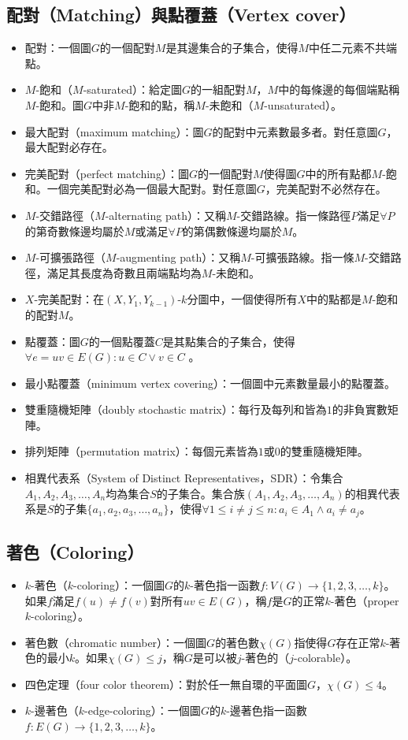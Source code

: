 \documentclass[a4paper,12pt]{report}
\begin{document}
\subsection{配對（Matching）與點覆蓋（Vertex cover）}
\begin{itemize}
\item 配對：一個圖$G$的一個配對$M$是其邊集合的子集合，使得$M$中任二元素不共端點。
\item $M$-飽和（$M$-saturated）：給定圖$G$的一組配對$M$，$M$中的每條邊的每個端點稱$M$-飽和。圖$G$中非$M$-飽和的點，稱$M$-未飽和（$M$-unsaturated）。
\item 最大配對（maximum matching）：圖$G$的配對中元素數最多者。對任意圖$G$，最大配對必存在。
\item 完美配對（perfect matching）：圖$G$的一個配對$M$使得圖$G$中的所有點都$M$-飽和。一個完美配對必為一個最大配對。對任意圖$G$，完美配對不必然存在。
\item $M$-交錯路徑（$M$-alternating path）：又稱$M$-交錯路線。指一條路徑$P$滿足$\forall P$的第奇數條邊均屬於$M$或滿足$\forall P$的第偶數條邊均屬於$M$。
\item $M$-可擴張路徑（$M$-augmenting path）：又稱$M$-可擴張路線。指一條$M$-交錯路徑，滿足其長度為奇數且兩端點均為$M$-未飽和。
\item $X$-完美配對：在$(X, Y_1, Y_{k-1})$-$k$分圖中，一個使得所有$X$中的點都是$M$-飽和的配對$M$。
\item 點覆蓋：圖$G$的一個點覆蓋$C$是其點集合的子集合，使得$\forall e=uv \in E(G): u\in C \vee v\in C$ 。
\item 最小點覆蓋（minimum vertex covering）：一個圖中元素數量最小的點覆蓋。
\item 雙重隨機矩陣（doubly stochastic matrix）：每行及每列和皆為$1$的非負實數矩陣。
\item 排列矩陣（permutation matrix）：每個元素皆為$1$或$0$的雙重隨機矩陣。
\item 相異代表系（System of Distinct Representatives，SDR）：令集合$A_1, A_2, A_3, \ldots, A_n$均為集合$S$的子集合。集合族$(A_1, A_2, A_3, \ldots, A_n)$的相異代表系是$S$的子集$\{a_1, a_2, a_3, \ldots, a_n\}$，使得$\forall 1\leq i \neq j \leq n: a_i \in A_1 \wedge a_i \neq a_j$。
\end{itemize}
\subsection{著色（Coloring）}
\begin{itemize}
\item $k$-著色（$k$-coloring）：一個圖$G$的$k$-著色指一函數$f: V(G) \rightarrow \{1, 2, 3, \ldots, k\}$。如果$f$滿足$f(u)\neq f(v)$對所有$uv\in E(G)$，稱$f$是$G$的正常$k$-著色（proper $k$-coloring）。
\item 著色數（chromatic number）：一個圖$G$的著色數$\chi(G)$指使得$G$存在正常$k$-著色的最小$k$。如果$\chi(G)\leq j$，稱$G$是可以被$j$-著色的（$j$-colorable）。
\item 四色定理（four color theorem）：對於任一無自環的平面圖$G$，$\chi(G)\leq 4$。
\item $k$-邊著色（$k$-edge-coloring）：一個圖$G$的$k$-邊著色指一函數$f: E(G) \rightarrow \{1, 2, 3, \ldots, k\}$。
\end{itemize}
\end{document}
